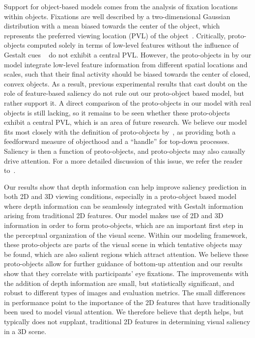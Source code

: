 \documentclass[12pt]{article}
\begin{document}
Support for object-based models comes from the analysis of fixation locations within objects. Fixations are well described by a two-dimensional Gaussian distribution with a mean biased towards the center of the object, which represents the preferred viewing location (PVL) of the object~\citep{Nuthman_Henderson10}. Critically, proto-objects computed solely in terms of low-level features without the influence of Gestalt cues ~\citep{Walther_Koch06} do not exhibit a central PVL.
However, the proto-objects in by our model integrate low-level feature information from different spatial locations and scales, such that their final activity should be biased towards the center of closed, convex objects.
As a result, previous experimental results that cast doubt on the role of feature-based saliency \citep{Einhauser_etal08a,Nuthman_Henderson10,Stoll_etal15} do not
rule out our proto-object based model, but rather support it.
A direct comparison of the proto-objects in our model with real objects is still lacking, so it remains to be seen whether these proto-objects exhibit a central PVL, which is an area of future research.
We believe our 
model fits most closely with the definition
of proto-objects by~\cite{Rensink00a},  as providing both a feedforward measure of objecthood
and a ``handle'' for top-down processes. Saliency is then a function of
proto-objects, and proto-objects may also causally drive
attention. For a more detailed discussion of this issue, we refer the
reader to~\citet{Russell_etal14}.
 
Our results show that depth information can help improve saliency
prediction in both 2D and 3D viewing conditions, especially in a
proto-object based model where depth information can be seamlessly
integrated with Gestalt information arising from traditional 2D
features. Our model makes use of 2D and 3D information in order to
form proto-objects, which are an important first step in the
perceptual organization of the visual scene.  Within our modeling
framework, these proto-objects are parts of the visual scene in which
tentative objects may be found, which are also salient regions which
attract attention. We believe these proto-objects allow for further
guidance of bottom-up attention and our results show that they
correlate with participants' eye fixations. The improvements with the
addition of depth information are small, but statistically
significant, and robust to different types of images and evaluation
metrics. The small differences in performance point to the importance
of the 2D features that have traditionally been used to model visual
attention. We therefore believe that depth helps, but typically does not
supplant, traditional 2D features in determining visual saliency in a
3D scene.
\end{document}
